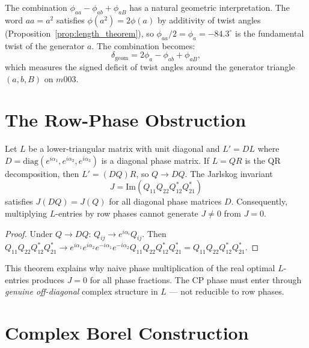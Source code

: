 \documentclass[epjc3]{svjour3}
\begin{document}
The combination $\phi_{aa} - \phi_{ab} + \phi_{aB}$ has a natural
geometric interpretation. The word $aa = a^2$ satisfies
$\phi(a^2) = 2\phi(a)$ by additivity of twist angles
(Proposition~\ref{prop:length_theorem}), so
$\phi_{aa}/2 = \phi_a = -84.3^\circ$ is the fundamental twist of
the generator $a$. The combination becomes:
\begin{equation}
\delta_{\mathrm{geom}} = 2\phi_a - \phi_{ab} + \phi_{aB},
\end{equation}
which measures the signed deficit of twist angles around the
generator triangle $(a, b, B)$ on $m003$.

\section{The Row-Phase Obstruction}
\label{sec:obstruction}

\begin{proposition}
\label{prop:rowphase}
Let $L$ be a lower-triangular matrix with unit diagonal and
$L' = DL$ where $D = \mathrm{diag}(e^{i\alpha_1}, e^{i\alpha_2},
e^{i\alpha_3})$ is a diagonal phase matrix.
If $L = QR$ is the QR decomposition, then $L' = (DQ)R$,
so $Q \to DQ$. The Jarlskog invariant
\begin{equation}
J = \mathrm{Im}(Q_{11}Q_{22}Q_{12}^* Q_{21}^*)
\end{equation}
satisfies $J(DQ) = J(Q)$ for all diagonal phase matrices $D$.
Consequently, multiplying $L$-entries by row phases cannot
generate $J \neq 0$ from $J = 0$.
\end{proposition}

\begin{proof}
Under $Q \to DQ$: $Q_{ij} \to e^{i\alpha_i}Q_{ij}$.
Then $Q_{11}Q_{22}Q_{12}^*Q_{21}^* \to
e^{i\alpha_1}e^{i\alpha_2}e^{-i\alpha_1}e^{-i\alpha_2}
Q_{11}Q_{22}Q_{12}^*Q_{21}^* = Q_{11}Q_{22}Q_{12}^*Q_{21}^*$.
\end{proof}

This theorem explains why naive phase multiplication of the real
optimal $L$-entries produces $J = 0$ for all phase fractions.
The CP phase must enter through \emph{genuine off-diagonal} complex
structure in $L$ — not reducible to row phases.

\section{Complex Borel Construction}
\label{sec:complex}
\end{document}

